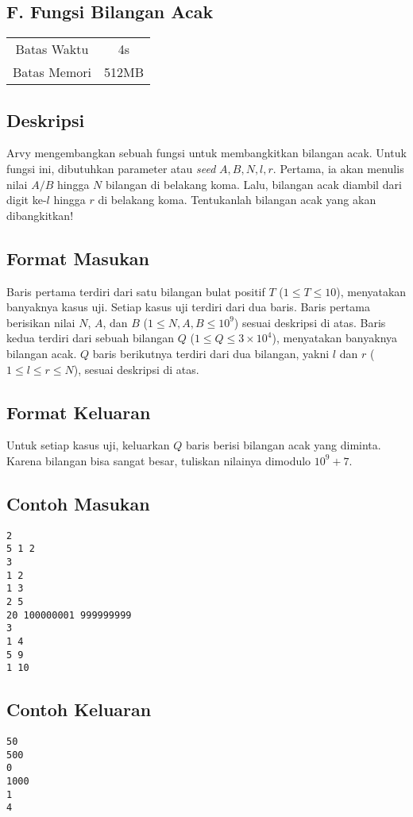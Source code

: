 \documentclass{article}
\begin{document}
\begin{center}
    \section*{F. Fungsi Bilangan Acak}

    \begin{tabular}{ | c c | }
        \hline
        Batas Waktu  & 4s \\
        Batas Memori & 512MB \\
        \hline
    \end{tabular}
\end{center}

\subsection*{Deskripsi}

Arvy mengembangkan sebuah fungsi untuk membangkitkan bilangan acak.
Untuk fungsi ini, dibutuhkan parameter atau \textit{seed} $A, B, N, l, r$.
Pertama, ia akan menulis nilai $A / B$ hingga $N$ bilangan di belakang koma.
Lalu, bilangan acak diambil dari digit ke-$l$ hingga $r$ di belakang koma.
Tentukanlah bilangan acak yang akan dibangkitkan!

\subsection*{Format Masukan}
Baris pertama terdiri dari satu bilangan bulat positif $T$ ($1 \leq T \leq 10$), menyatakan banyaknya kasus uji.
Setiap kasus uji terdiri dari dua baris.
Baris pertama berisikan nilai $N$, $A$, dan $B$ ($1 \leq N, A, B \leq 10^{9}$) sesuai deskripsi di atas.
Baris kedua terdiri dari sebuah bilangan $Q$ ($1 \leq Q \leq 3 \times 10^{4}$), menyatakan banyaknya bilangan acak.
$Q$ baris berikutnya terdiri dari dua bilangan, yakni $l$ dan $r$ ($1 \leq l \leq r \leq N$), sesuai deskripsi di atas.

\subsection*{Format Keluaran}
Untuk setiap kasus uji, keluarkan $Q$ baris berisi bilangan acak yang diminta. Karena bilangan bisa sangat besar, tuliskan nilainya dimodulo $10^{9}+7$.

\begin{multicols}{2}
\subsection*{Contoh Masukan}
\begin{lstlisting}
2
5 1 2
3
1 2
1 3
2 5
20 100000001 999999999
3
1 4
5 9
1 10
\end{lstlisting}
\columnbreak
\subsection*{Contoh Keluaran}
\begin{lstlisting}
50
500
0
1000
1
4
\end{lstlisting}
\vfill
\null
\end{multicols}
\end{document}
